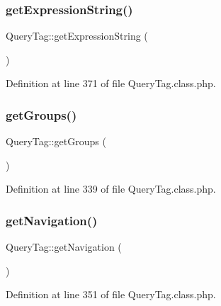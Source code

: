 \hypertarget{classQueryTag_a93b4b4a6a4362f1792f72683983ab8d6}{}\label{classQueryTag_a93b4b4a6a4362f1792f72683983ab8d6} 
\subsubsection{\texorpdfstring{get\+Expression\+String()}{getExpressionString()}}
{\footnotesize\ttfamily Query\+Tag\+::get\+Expression\+String (\begin{DoxyParamCaption}{ }\end{DoxyParamCaption})}



Definition at line 371 of file Query\+Tag.\+class.\+php.

\hypertarget{classQueryTag_a1401e1676925bf78bcbbdb6ed5ad7bf0}{}\label{classQueryTag_a1401e1676925bf78bcbbdb6ed5ad7bf0} 
\subsubsection{\texorpdfstring{get\+Groups()}{getGroups()}}
{\footnotesize\ttfamily Query\+Tag\+::get\+Groups (\begin{DoxyParamCaption}{ }\end{DoxyParamCaption})}



Definition at line 339 of file Query\+Tag.\+class.\+php.

\hypertarget{classQueryTag_a5e2bfd8ddd3fc2d64efe6da1af0da8f8}{}\label{classQueryTag_a5e2bfd8ddd3fc2d64efe6da1af0da8f8} 
\subsubsection{\texorpdfstring{get\+Navigation()}{getNavigation()}}
{\footnotesize\ttfamily Query\+Tag\+::get\+Navigation (\begin{DoxyParamCaption}{ }\end{DoxyParamCaption})}



Definition at line 351 of file Query\+Tag.\+class.\+php.

\hypertarget{classQueryTag_ab87ed2df775139a76a47f8d12daff6ba}{}\label{classQueryTag_ab87ed2df775139a76a47f8d12daff6ba} 
